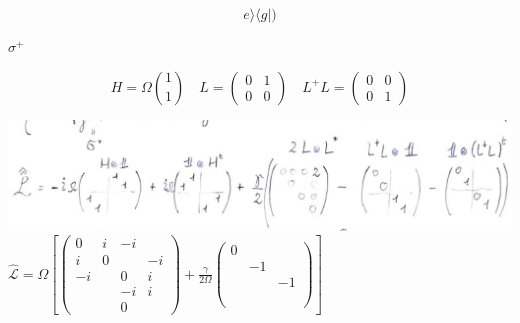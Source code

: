 \documentclass[10pt]{article}
\begin{document}
$$
e\rangle\langle g|)
$$

$\sigma^{+}$

$$
H=\Omega\binom{1}{1} \quad L=\left(\begin{array}{ll}
0 & 1 \\
0 & 0
\end{array}\right) \quad L^{+} L=\left(\begin{array}{ll}
0 & 0 \\
0 & 1
\end{array}\right)
$$

\includegraphics[max width=\textwidth, center]{2025_10_16_1bd50d0393172dac5e59g-12}\\
$\hat{\mathcal{L}}=\Omega\left[\left(\begin{array}{cccc}0 & i & -i & \\ i & 0 & & -i \\ -i & & 0 & i \\ & & -i & i \\ & & 0\end{array}\right)+\frac{\gamma}{2 \Omega}\left(\begin{array}{lll}0 & & \\ & -1 & \\ & & -1 \\ & & \\ & & \\ & & \end{array}\right)\right]$
\end{document}
